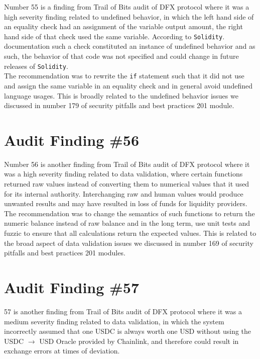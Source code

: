 Number 55 is a finding from Trail of Bits audit of DFX protocol where it was a high severity finding related to undefined behavior, in which the left hand side of an equality check had an assignment of the variable output amount, the right hand side of that check used the same variable. According to \verb|Solidity|. documentation such a check constituted an instance of undefined behavior and as such, the behavior of that code was not specified and could change in future releases of \verb|Solidity|.\\

The recommendation was to rewrite the \verb|if| statement such that it did not use and assign the same variable in an equality check and in general avoid undefined language usages. This is broadly related to the undefined behavior issues we discussed in number 179 of security pitfalls and best practices 201 module.

\section{Audit Finding \#56}

Number 56 is another finding from Trail of Bits audit of DFX protocol where it was a high severity finding related to data validation, where certain functions returned raw values instead of converting them to numerical values that it used for its internal authority. Interchanging raw and human values would produce unwanted results and may have resulted in loss of funds for liquidity providers.\\

The recommendation was to change the semantics of such functions to return the numeric balance instead of raw balance and in the long term, use unit tests and fuzzic to ensure that all calculations return the expected values. This is related to the broad aspect of data validation issues we discussed in number 169 of security pitfalls and best practices 201 modules.

\section{Audit Finding \#57}

57 is another finding from Trail of Bits audit of DFX protocol where it was a medium severity finding related to data validation, in which the system incorrectly assumed that one USDC is always worth one USD without using the USDC $\rightarrow$ USD Oracle provided by Chainlink, and therefore could result in exchange errors at times of deviation.\\

